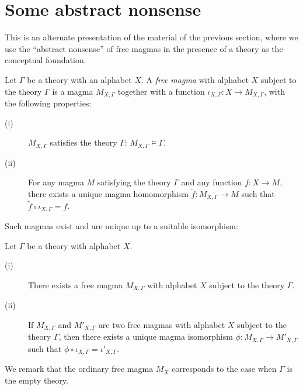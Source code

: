 \chapter{Some abstract nonsense}\label{abstract-nonsense-chapter}

This is an alternate presentation of the material of the previous section, where we use the ``abstract nonsense'' of free magmas in the presence of a theory as the conceptual foundation.

\begin{definition}\label{free-theory}\leanok{}
  Let $\Gamma$ be a theory with an alphabet $X$. A \emph{free magma} with alphabet $X$ subject to the theory $\Gamma$ is a magma $M_{X,\Gamma}$ together with a function $\iota_{X,\Gamma} : X \to M_{X,\Gamma}$, with the following properties:
  \begin{description}
    \item[(i)] $M_{X,\Gamma}$ satisfies the theory $\Gamma$: $M_{X,\Gamma} \models \Gamma$.
    \item[(ii)] For any magma $M$ satisfying the theory $\Gamma$ and any function $f: X \to M$, there exists a unique magma homomorphism $\tilde{f}: M_{X,\Gamma} \to M$ such that $\tilde{f} \circ \iota_{X,\Gamma} = f$.
  \end{description}
\end{definition}

Such magmas exist and are unique up to a suitable isomorphism:

\begin{theorem}\label{freemag-exist}\leanok
  Let $\Gamma$ be a theory with alphabet $X$.
  \begin{description}
    \item[(i)] There exists a free magma $M_{X,\Gamma}$ with alphabet $X$ subject to the theory $\Gamma$.
    \item[(ii)] If $M_{X,\Gamma}$ and $M'_{X,\Gamma}$ are two free magmas with alphabet $X$ subject to the theory $\Gamma$, then there exists a unique magma isomorphism $\phi: M_{X,\Gamma} \to M'_{X,\Gamma}$ such that $\phi \circ \iota_{X,\Gamma} = \iota'_{X,\Gamma}$.
  \end{description}
\end{theorem}

We remark that the ordinary free magma $M_X$ corresponds to the case when $\Gamma$ is the empty theory.

